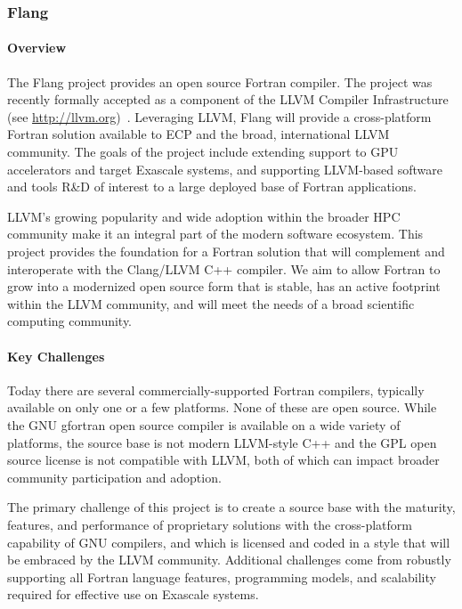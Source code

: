 \subsubsection{ Flang}\label{subsubsect:flang}

\paragraph{Overview}

The Flang project provides an open source Fortran
\cite{iso-fortran-2004} \cite{iso-fortran-2010} \cite{iso-fortran-2018}
compiler.  The project was recently formally accepted as a component
of the LLVM Compiler Infrastructure (see \url{http://llvm.org})~\cite{llvm:homepage}.
Leveraging LLVM, Flang will provide a cross-platform Fortran solution available to
ECP and the broad, international LLVM community. The goals of the project include
extending support to GPU accelerators and target Exascale systems, and supporting
LLVM-based software and tools R\&D of interest to a large deployed
base of Fortran applications.

LLVM's growing popularity and wide adoption within the
broader HPC community make it an integral part of the modern software ecosystem.
This project provides the foundation for a Fortran solution that will complement and interoperate with the
Clang/LLVM C++ compiler.  We aim to allow Fortran to grow into a
modernized open source form that is stable, has an active footprint
within the LLVM community, and will meet the needs of a broad
scientific computing community.

\paragraph{Key Challenges}
Today there are several commercially-supported Fortran compilers,
typically available on only one or a few platforms.  None of these are
open source.  While the GNU gfortran open source compiler is available
on a wide variety of platforms, the source base is not modern
LLVM-style C++ and the GPL open source license is not compatible with
LLVM, both of which can impact broader community participation and adoption.

The primary challenge of this project is to create a source base with
the maturity, features, and performance of proprietary solutions with
the cross-platform capability of GNU compilers, and which is licensed
and coded in a style that will be embraced by the LLVM community.
Additional challenges come from robustly supporting all Fortran
language features, programming models, and scalability required for effective use on Exascale systems. 

